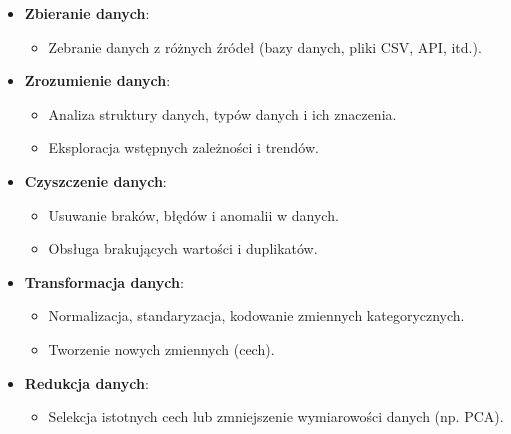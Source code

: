 \documentclass[
  letterpaper,
  DIV=11,
  numbers=noendperiod]{scrreprt}
\providecommand{\tightlist}{%
  \setlength{\itemsep}{0pt}\setlength{\parskip}{0pt}}\usepackage{longtable,booktabs,array}
\begin{document}
\begin{itemize}
\tightlist
\item
  \textbf{Zbieranie danych}:

  \begin{itemize}
  \tightlist
  \item
    Zebranie danych z różnych źródeł (bazy danych, pliki CSV, API,
    itd.).
  \end{itemize}
\item
  \textbf{Zrozumienie danych}:

  \begin{itemize}
  \tightlist
  \item
    Analiza struktury danych, typów danych i ich znaczenia.
  \item
    Eksploracja wstępnych zależności i trendów.
  \end{itemize}
\item
  \textbf{Czyszczenie danych}:

  \begin{itemize}
  \tightlist
  \item
    Usuwanie braków, błędów i anomalii w danych.
  \item
    Obsługa brakujących wartości i duplikatów.
  \end{itemize}
\item
  \textbf{Transformacja danych}:

  \begin{itemize}
  \tightlist
  \item
    Normalizacja, standaryzacja, kodowanie zmiennych kategorycznych.
  \item
    Tworzenie nowych zmiennych (cech).
  \end{itemize}
\item
  \textbf{Redukcja danych}:

  \begin{itemize}
  \tightlist
  \item
    Selekcja istotnych cech lub zmniejszenie wymiarowości danych (np.
    PCA).
  \end{itemize}
\end{itemize}
\end{document}
